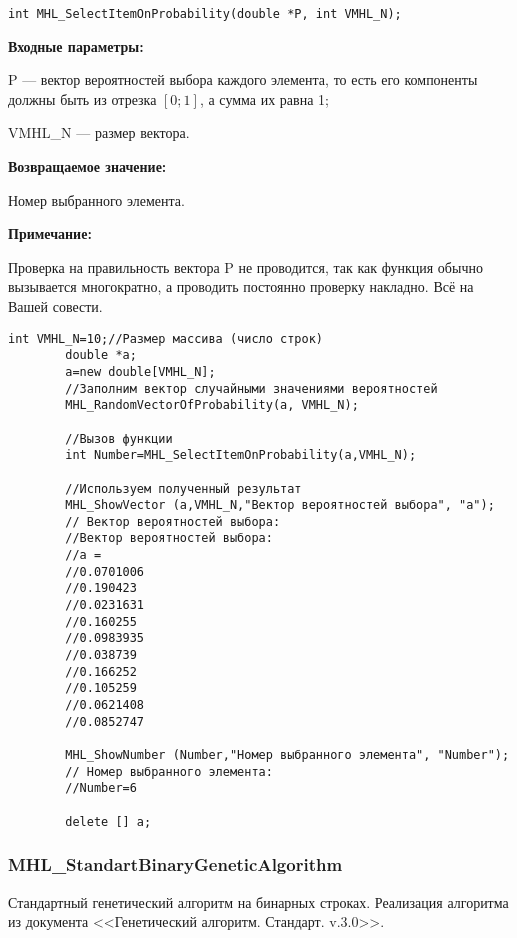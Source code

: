 \documentclass[a4paper,12pt]{article}
\begin{document}
\begin{lstlisting}[label=code_syntax_MHL_SelectItemOnProbability,caption=Синтаксис]
int MHL_SelectItemOnProbability(double *P, int VMHL_N);
\end{lstlisting}

\textbf{Входные параметры:}
 
 P --- вектор вероятностей выбора каждого элемента, то есть его компоненты должны быть из отрезка $[0;1]$, а сумма их равна 1;
 
 VMHL\_N --- размер вектора.

\textbf{Возвращаемое значение:} 

Номер выбранного элемента.

\textbf{Примечание:}

 Проверка на правильность вектора P не проводится, так как функция обычно вызывается многократно, а проводить постоянно проверку накладно. Всё на Вашей совести.



\begin{lstlisting}[label=code_use_MHL_SelectItemOnProbability,caption=Пример использования]
        int VMHL_N=10;//Размер массива (число строк)
        double *a;
        a=new double[VMHL_N];
        //Заполним вектор случайными значениями вероятностей
        MHL_RandomVectorOfProbability(a, VMHL_N);

        //Вызов функции
        int Number=MHL_SelectItemOnProbability(a,VMHL_N);

        //Используем полученный результат
        MHL_ShowVector (a,VMHL_N,"Вектор вероятностей выбора", "a");
        // Вектор вероятностей выбора:
        //Вектор вероятностей выбора:
        //a =
        //0.0701006
        //0.190423
        //0.0231631
        //0.160255
        //0.0983935
        //0.038739
        //0.166252
        //0.105259
        //0.0621408
        //0.0852747

        MHL_ShowNumber (Number,"Номер выбранного элемента", "Number");
        // Номер выбранного элемента:
        //Number=6

        delete [] a;
\end{lstlisting}

\subsubsection{MHL\_StandartBinaryGeneticAlgorithm}\label{MHL_StandartBinaryGeneticAlgorithm}

Стандартный генетический алгоритм на бинарных строках. Реализация алгоритма из документа <<Генетический алгоритм. Стандарт. v.3.0>>.
\end{document}
